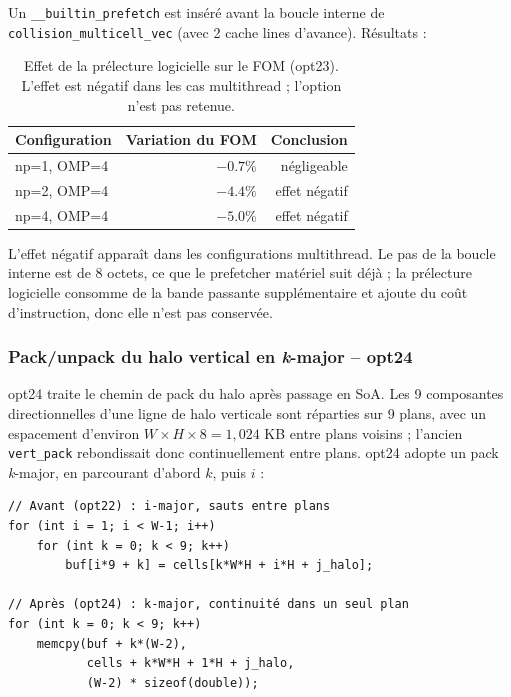 \documentclass[a4paper,11pt,oneside]{report}
\newcommand{\code}[1]{\texttt{#1}}
\begin{document}
Un \code{\_\_builtin\_prefetch} est inséré avant la boucle interne de \code{collision\_multicell\_vec}
(avec 2 cache lines d'avance). Résultats :

\begin{table}[H]
\centering
\begin{tabular}{@{}lrr@{}}
\toprule
\textbf{Configuration} & \textbf{Variation du FOM} & \textbf{Conclusion} \\
\midrule
np=1, OMP=4 & $-0.7\%$ & négligeable \\
np=2, OMP=4 & $-4.4\%$ & effet négatif \\
np=4, OMP=4 & $-5.0\%$ & effet négatif \\
\bottomrule
\end{tabular}
\caption{Effet de la prélecture logicielle sur le FOM (opt23). L'effet est négatif dans les cas multithread ; l'option n'est pas retenue.}
\end{table}

L'effet négatif apparaît dans les configurations multithread. Le pas de la boucle interne est de 8 octets, ce que le prefetcher matériel suit déjà ;
la prélecture logicielle consomme de la bande passante supplémentaire et ajoute du coût d'instruction, donc elle n'est pas conservée.

\subsubsection{Pack/unpack du halo vertical en \textit{k}-major -- opt24}

opt24 traite le chemin de pack du halo après passage en SoA. Les 9 composantes directionnelles d'une ligne de halo verticale sont réparties sur 9 plans,
avec un espacement d'environ $W \times H \times 8 = 1{,}024$ KB entre plans voisins ; l'ancien \code{vert\_pack}
rebondissait donc continuellement entre plans. opt24 adopte un pack \textit{k}-major, en parcourant d'abord $k$, puis $i$ :

\begin{lstlisting}
// Avant (opt22) : i-major, sauts entre plans
for (int i = 1; i < W-1; i++)
    for (int k = 0; k < 9; k++)
        buf[i*9 + k] = cells[k*W*H + i*H + j_halo];

// Après (opt24) : k-major, continuité dans un seul plan
for (int k = 0; k < 9; k++)
    memcpy(buf + k*(W-2),
           cells + k*W*H + 1*H + j_halo,
           (W-2) * sizeof(double));
\end{lstlisting}
\end{document}
